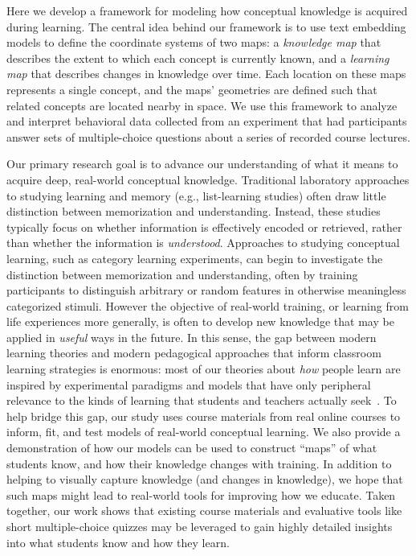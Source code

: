 \documentclass[10pt]{article}
\begin{document}
Here we develop a framework for modeling how conceptual knowledge is acquired
during learning. The central idea behind our framework is to use text embedding
models to define the coordinate systems of two maps: a \textit{knowledge
map} that describes the extent to which each concept is currently known, and
a \textit{learning map} that describes changes in knowledge over time. Each
location on these maps represents a single concept, and the maps' geometries
are defined such that related concepts are located nearby in space. We use this
framework to analyze and interpret behavioral data collected from an experiment
that had participants answer sets of multiple-choice questions about a series of
recorded course lectures.

Our primary research goal is to advance our understanding of what it means to
acquire deep, real-world conceptual knowledge. Traditional laboratory
approaches to studying learning and memory (e.g., list-learning studies) often
draw little distinction between memorization and understanding. Instead, these
studies typically focus on whether information is effectively encoded or
retrieved, rather than whether the information is \textit{understood}.
Approaches to studying conceptual learning, such as category learning
experiments, can begin to investigate the distinction between memorization and
understanding, often by training participants to distinguish arbitrary or
random features in otherwise meaningless categorized stimuli. However the
objective of real-world training, or learning from life experiences more
generally, is often to develop new knowledge that may be applied in
\textit{useful} ways in the future. In this sense, the gap between modern
learning theories and modern pedagogical approaches that inform classroom
learning strategies is enormous: most of our theories about \textit{how} people
learn are inspired by experimental paradigms and models that have only
peripheral relevance to the kinds of learning that students and teachers
actually seek~\citep{Macl05, HallGree08}. To help bridge this gap, our study
uses course materials from real online courses to inform, fit, and test models
of real-world conceptual learning. We also provide a demonstration of how our
models can be used to construct ``maps'' of what students know, and how their
knowledge changes with training. In addition to helping to visually capture knowledge
(and changes in knowledge), we hope that such maps might lead to real-world
tools for improving how we educate. Taken together, our work shows that
existing course materials and evaluative tools like short multiple-choice
quizzes may be leveraged to gain highly detailed insights into what students
know and how they learn.
\end{document}
